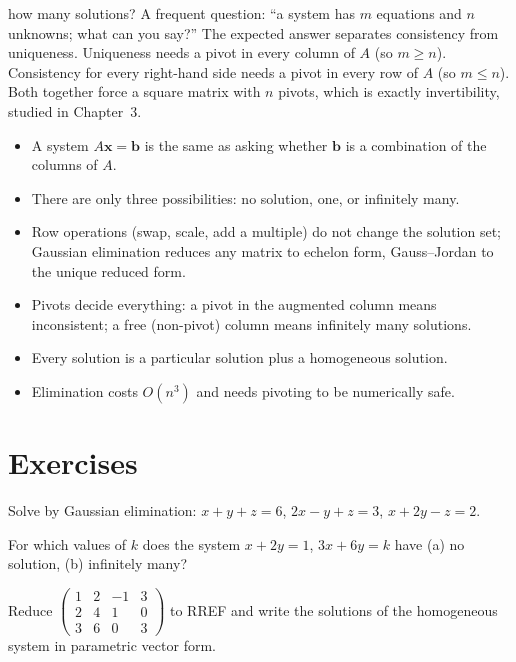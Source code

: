 \begin{interview}{how many solutions?}
A frequent question: ``a system has $m$ equations and $n$ unknowns; what can you say?'' The expected answer separates consistency from uniqueness. Uniqueness needs a pivot in every column of $A$ (so $m\ge n$). Consistency for every right-hand side needs a pivot in every row of $A$ (so $m\le n$). Both together force a square matrix with $n$ pivots, which is exactly invertibility, studied in Chapter~3.
\end{interview}

\begin{summarybox}
\begin{itemize}
  \item A system $A\mathbf{x}=\mathbf{b}$ is the same as asking whether $\mathbf{b}$ is a combination of the columns of $A$.
  \item There are only three possibilities: no solution, one, or infinitely many.
  \item Row operations (swap, scale, add a multiple) do not change the solution set; Gaussian elimination reduces any matrix to echelon form, Gauss--Jordan to the unique reduced form.
  \item Pivots decide everything: a pivot in the augmented column means inconsistent; a free (non-pivot) column means infinitely many solutions.
  \item Every solution is a particular solution plus a homogeneous solution.
  \item Elimination costs $O(n^3)$ and needs pivoting to be numerically safe.
\end{itemize}
\end{summarybox}

\section{Exercises}

\begin{exercise}
Solve by Gaussian elimination: $x+y+z=6$, $2x-y+z=3$, $x+2y-z=2$.
\end{exercise}

\begin{exercise}
For which values of $k$ does the system $x+2y=1$, $3x+6y=k$ have (a) no solution, (b) infinitely many?
\end{exercise}

\begin{exercise}
Reduce $\begin{pmatrix}1&2&-1&3\\2&4&1&0\\3&6&0&3\end{pmatrix}$ to RREF and write the solutions of the homogeneous system in parametric vector form.
\end{exercise}

